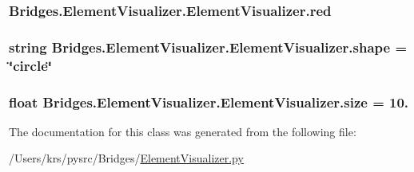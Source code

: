 \subsubsection[{red}]{\setlength{\rightskip}{0pt plus 5cm}Bridges.\+Element\+Visualizer.\+Element\+Visualizer.\+red}\label{class_bridges_1_1_element_visualizer_1_1_element_visualizer_a44266d81c1904956ae315cefa1cee31a}
\hypertarget{class_bridges_1_1_element_visualizer_1_1_element_visualizer_a1ae8dcb88a4ccb84df24aafed271ea7f}{}
\subsubsection[{shape}]{\setlength{\rightskip}{0pt plus 5cm}string Bridges.\+Element\+Visualizer.\+Element\+Visualizer.\+shape = \char`\"{}circle\char`\"{}\hspace{0.3cm}{\ttfamily [static]}}\label{class_bridges_1_1_element_visualizer_1_1_element_visualizer_a1ae8dcb88a4ccb84df24aafed271ea7f}
\hypertarget{class_bridges_1_1_element_visualizer_1_1_element_visualizer_a5d3eefae7745c6db65147c7b1361d208}{}
\subsubsection[{size}]{\setlength{\rightskip}{0pt plus 5cm}float Bridges.\+Element\+Visualizer.\+Element\+Visualizer.\+size = 10.\hspace{0.3cm}{\ttfamily [static]}}\label{class_bridges_1_1_element_visualizer_1_1_element_visualizer_a5d3eefae7745c6db65147c7b1361d208}


The documentation for this class was generated from the following file\+:\begin{DoxyCompactItemize}
\item 
/\+Users/krs/pysrc/\+Bridges/\hyperlink{_element_visualizer_8py}{Element\+Visualizer.\+py}\end{DoxyCompactItemize}
